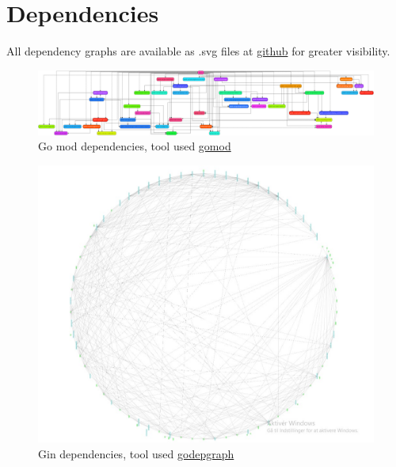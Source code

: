 \section{Dependencies}\label{app:gomod_dependencies}
All dependency graphs are available as .svg files at \href{https://github.com/DevelOpsITU/DevOps_report/tree/main/images/diagrams}{github} for greater visibility.

\begin{figure}[H]
    \centering
    \includegraphics[width=\linewidth%
    ]{images/diagrams/gomod-dependency-graph.png}
    \caption{Go mod dependencies, tool used \href{https://github.com/Helcaraxan/gomod}{gomod}}
    \label{fig:gomod_dependencies}
\end{figure}

\begin{figure}[H]
    \centering
    \includegraphics[width=\linewidth,angle=90]{images/diagrams/gin_dependency_compressed.jpg}
    \caption{Gin dependencies, tool used \href{https://github.com/kisielk/godepgraph}{godepgraph}}
    \label{fig:gin_dependencies}
\end{figure}